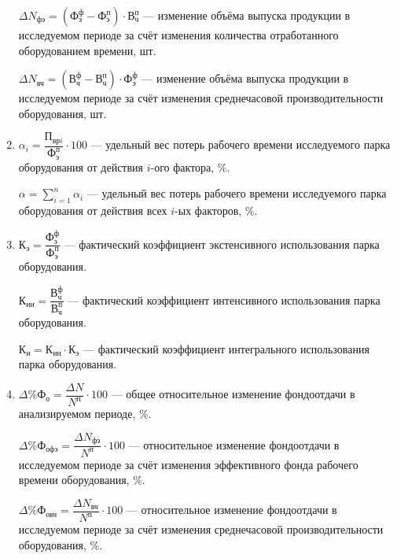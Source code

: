 \begin{enumerate}
    $ \Delta N_{\text{фэ}} = (\text{Ф}^{\text{ф}}_{\text{э}} - \text{Ф}^{\text{п}}_{\text{э}}) \cdot \text{В}^{\text{п}}_{\text{ч}} $
    --- изменение объёма выпуска продукции в исследуемом периоде за счёт изменения количества отработанного
    оборудованием времени, шт.

    $ \Delta N_{\text{вч}} = (\text{В}^{\text{ф}}_{\text{ч}} - \text{В}^{\text{п}}_{\text{ч}}) \cdot \text{Ф}^{\text{ф}}_{\text{э}} $
    --- изменение объёма выпуска продукции в исследуемом периоде за счёт изменения среднечасовой производительности оборудования, шт.

  \item $ \alpha_i = \dfrac{\text{П}_{\text{вр}i}}{\text{Ф}^{\text{п}}_{\text{э}}} \cdot 100 $
    --- удельный вес потерь рабочего времени исследуемого парка оборудования от действия $i$-ого фактора, \%.

    $ \alpha = \sum\limits^{n}_{i=1}\alpha_i $
    --- удельный вес потерь рабочего времени исследуемого парка оборудования от действия всех $i$-ых факторов, \%.

  \item $ \text{К}_{\text{э}} = \dfrac{\text{Ф}^{\text{ф}}_{\text{э}}}{\text{Ф}^{\text{п}}_{\text{э}}} $
    --- фактический коэффициент экстенсивного использования парка оборудования.

    $ \text{К}_{\text{ин}} = \dfrac{\text{В}^{\text{ф}}_{\text{ч}}}{\text{В}^{\text{п}}_{\text{ч}}} $
    --- фактический коэффициент интенсивного использования парка оборудования.

    $ \text{К}_{\text{и}} = \text{К}_{\text{ин}} \cdot \text{К}_{\text{э}} $
    --- фактический коэффициент интегрального использования парка оборудования.

  \item $ \Delta \% \text{Ф}_{\text{о}} = \dfrac{\Delta N}{N^{\text{п}}} \cdot 100 $
    --- общее относительное изменение фондоотдачи в анализируемом периоде, \%.

    $ \Delta \% \text{Ф}_{\text{офэ}} = \dfrac{\Delta N_{\text{фэ}}}{N^{\text{п}}} \cdot 100 $
    --- относительное изменение фондоотдачи в исследуемом периоде за счёт изменения эффективного
    фонда рабочего времени оборудования, \%.

    $ \Delta \% \text{Ф}_{\text{овч}} = \dfrac{\Delta N_{\text{вч}}}{N^{\text{п}}} \cdot 100 $
    --- относительное изменение фондоотдачи в исследуемом периоде за счёт изменения среднечасовой
    производительности оборудования, \%.

\end{enumerate}

